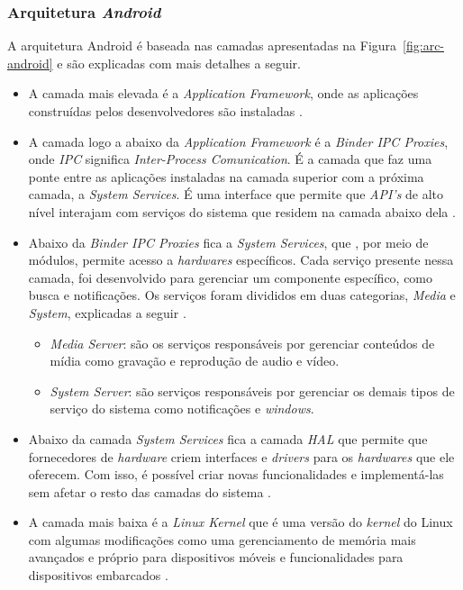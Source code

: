 \subsubsection{Arquitetura \textit{Android}} \label{subsection:arc-android}

A arquitetura Android é baseada nas camadas apresentadas na Figura~\ref{fig:arc-android} e são explicadas com mais detalhes a seguir.

\begin{itemize}

    \item A camada mais elevada é a \textit{Application Framework}, onde as aplicações construídas pelos desenvolvedores são instaladas \cite{android_android_2016}.
    \item A camada logo a abaixo da \textit{Application Framework} é a \textit{Binder IPC Proxies}, onde \textit{IPC} significa \textit{Inter-Process Comunication}.
    É a camada que faz uma ponte entre as aplicações instaladas na camada superior com a próxima camada, a \textit{System Services}. É uma interface que permite que \textit{API's}
    de alto nível interajam com serviços do sistema que residem na camada abaixo dela \cite{android_android_2016}. 
    \item Abaixo da \textit{Binder IPC Proxies} fica a \textit{System Services}, que , por meio de módulos, permite acesso a \textit{hardwares} específicos. Cada serviço presente nessa camada,
    foi desenvolvido para gerenciar um componente específico, como busca e notificações. Os serviços foram divididos em duas categorias, \textit{Media} e \textit{System}, explicadas a seguir \cite{android_android_2016}.
    \begin{itemize}
        \item \textit{Media Server}: são os serviços responsáveis por gerenciar conteúdos de mídia como gravação e reprodução de audio e vídeo. 
        \item \textit{System Server}: são serviços responsáveis por gerenciar os demais tipos de serviço do sistema como notificações e \textit{windows}.
    \end{itemize}
    \item Abaixo da camada \textit{System Services} fica a camada \textit{HAL} que permite que fornecedores de \textit{hardware} criem interfaces e \textit{drivers} para os \textit{hardwares} que
    ele oferecem. Com isso, é possível criar novas funcionalidades e implementá-las sem afetar o resto das camadas do sistema \cite{android_android_2016}.  
    \item A camada mais baixa é a \textit{Linux Kernel} que é uma versão do \textit{kernel} do Linux com algumas modificações como uma gerenciamento de memória mais avançados e próprio para dispositivos 
    móveis e funcionalidades para dispositivos embarcados \cite{android_android_2016}. 
    
\end{itemize}

